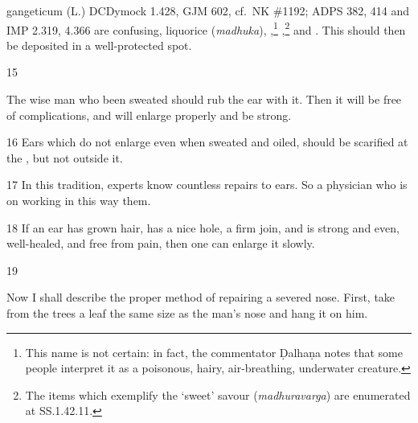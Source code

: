 \begin{translation}
{        gangeticum (L.) DC}{Dymock 1.428, GJM 602, cf.\ NK
        \#1192; ADPS 382, 414 and IMP 2.319, 4.366 are confusing},
    liquorice (\emph{madhuka}),
    ,\footnote{This name is not
    certain: in fact, the commentator Ḍalhaṇa notes that some people interpret
    it as a poisonous, hairy, air-breathing, underwater creature.}
    ,\footnote{The
    items which exemplify the `sweet' savour \label{kakolyadi}
    (\emph{madhuravarga}) are enumerated at SS.1.42.11.} and
    .
    This should then be deposited in a well-protected spot.
    
    \item[15]%
    \begin{sloka}
        
        The wise man who been sweated should rub the  ear with 
        it. 
        Then it will be free of complications, and will enlarge properly and be strong.
    \end{sloka}
    
    \item[16]
    Ears which do not enlarge even when sweated and oiled, 
    should be scarified
    at the , but not outside it.  
    
    
    \item[17]
    In this tradition, experts know countless repairs to ears.  So a 
    physician who is  on working in this way 
     them.
    
    \item[18]
    If an ear has grown hair, has a nice hole, a firm join, and is strong and
    even, well-healed, and free from pain, then one can enlarge it slowly.
    
    
    \item[19]
    
    Now I shall describe the proper method of repairing a severed nose.
    First, take from the trees a leaf the same size as the man's nose and hang it
    on him. 
    

\end{translation}
